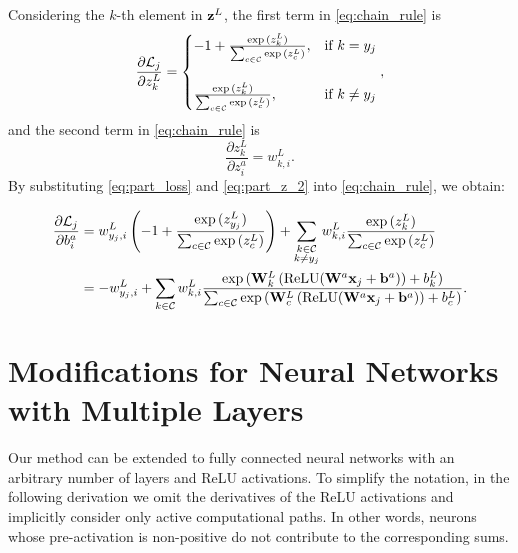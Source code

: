 Considering the $k$-th element in ${\mathbf{z}}^{L}$, the first term in \eqref{eq:chain_rule} is
\begin{equation}
    \label{eq:part_loss}
    \frac{\partial{\ensuremath{\mathcal{L}}_j}}{\partial{z^{L}_k}}= \begin{cases}
        -1 + \frac{\exp{(z^{L}_k)}}{\sum_{c\in \mathcal{C}}\exp{(z^{L}_c)}}, & \text{if $k=y_j$} \\
        \\
        \frac{\exp{(z^{L}_k)}}{\sum_{c\in \mathcal{C}}\exp{(z^{L}_c)}}, & \text{if $k\neq y_j$}
    \end{cases},
\end{equation}
and the second term in \eqref{eq:chain_rule} is
\begin{equation}
\label{eq:part_z_2}
    \frac{\partial{z_k^{L}}}{\partial{z_i^{a}}} = w_{k,i}^{L}.
\end{equation}
By substituting \eqref{eq:part_loss} and \eqref{eq:part_z_2} into \eqref{eq:chain_rule}, we obtain:

\begin{align}
    \label{eq:part_loss_bias_ext}
    \frac{\partial{\ensuremath{\mathcal{L}}_j}}{\partial{b^{a}_i}} &= w_{y_j, i}^{L} \left(-1 + \frac{\exp{(z^{L}_{y_j})}}{\sum_{c\in \mathcal{C}}\exp{(z^{L}_c)}}\right)+ \sum_{\substack{k \in \mathcal{C} \\ k \neq y_j}}w_{k,i}^{L}  \frac{\exp{(z^{L}_k)}}{\sum_{c\in \mathcal{C}}\exp{(z^{L}_c)}} \\
    &= - w_{y_j,i}^{L}\notag  + \sum_{\substack{k \in \mathcal{C}}}w_{k,i}^{L} \frac{\exp{(\mathbf{W}_{k}^{L}\left(\textrm{ReLU}(\mathbf{W}^{a}{\mathbf{x}}_j + {\mathbf{b}}^{a})\right) + b_{k}^{L})}}{\sum_{c\in \mathcal{C}}\exp{(\mathbf{W}_{c}^{L}\left(\textrm{ReLU}(\mathbf{W}^{a}{\mathbf{x}}_j + {\mathbf{b}}^{a})\right) + b_{c}^{L})}}. 
\end{align}


\section{Modifications for Neural Networks with Multiple Layers}
\label{app:gener_nn}

Our method can be extended to fully connected neural networks with an arbitrary number of layers and ReLU activations. To simplify the notation, in the following derivation we omit the derivatives of the ReLU activations and implicitly consider only active computational paths. In other words, neurons whose pre-activation is non-positive do not contribute to the corresponding sums.


